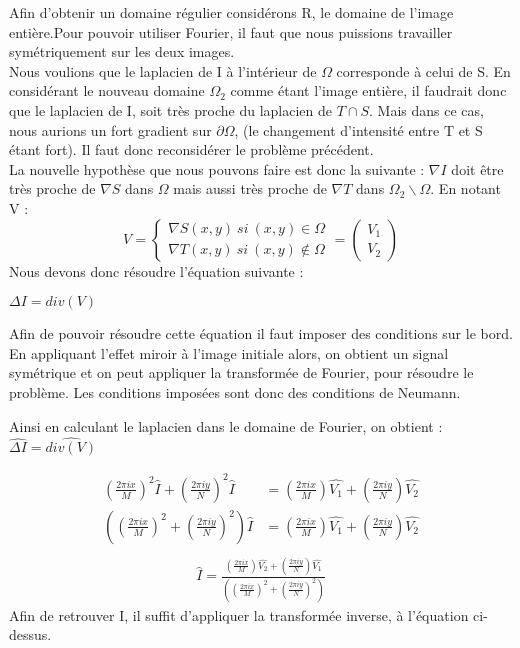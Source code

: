 Afin d'obtenir un domaine régulier considérons R, le domaine de l'image entière.Pour pouvoir utiliser Fourier, il faut que nous puissions travailler symétriquement sur les deux images.\\
Nous voulions que le laplacien de I à l'intérieur de $\Omega$ corresponde à celui de S. En considérant le nouveau domaine $\Omega_2$ comme étant l'image entière, il faudrait donc que le laplacien de I, soit très proche du laplacien de $T \cap S$. Mais dans ce cas, nous aurions un fort gradient sur $\partial \Omega$, (le  changement d'intensité entre T et S étant fort).  Il faut donc reconsidérer le problème précédent. \\
La nouvelle hypothèse que nous pouvons faire  est donc la suivante : $\nabla I$ doit être très proche de $\nabla S$ dans $\Omega$ mais aussi très proche de $\nabla T$ dans $\Omega_2 \backslash \Omega$. En notant V : 
\begin{equation}
V = 
\left\{
\begin{aligned}
\nabla S(x,y) \ si \ (x,y) \in \Omega\\
\nabla T(x,y) \ si \ (x,y) \notin \Omega
\end{aligned}
\right.
= \begin{pmatrix}
V_1\\
V_2
\end{pmatrix}
\end{equation}
Nous devons donc résoudre l'équation suivante : 
\begin{center}
$ \Delta I = div(V)$
\end{center}
Afin de pouvoir résoudre cette équation il faut imposer des conditions sur le bord. En appliquant l'effet miroir à l'image initiale alors, on obtient un signal symétrique  et on peut appliquer la transformée de Fourier, pour résoudre le problème.  Les conditions imposées sont donc des conditions de Neumann.

Ainsi en calculant le laplacien dans le domaine de Fourier, on obtient  : $\widehat{\Delta I} = \widehat{div(V)}$

\begin{equation}
\begin{aligned}
\left(\frac{2\pi i x}{M}\right)^2 \widehat{I}+\left(\frac{2\pi i y}{N}\right)^2 \widehat{I} & = \left(\frac{2\pi i x}{M}\right) \widehat{V_1}+\left(\frac{2\pi i y}{N}\right) \widehat{V_2}\\
\left(\left(\frac{2\pi i x}{M}\right)^2+\left(\frac{2\pi i y}{N}\right)^2\right) \widehat{I} & = \left(\frac{2\pi i x}{M}\right) \widehat{ V_1}+\left(\frac{2\pi i y}{N}\right) \widehat{V_2}\\
\end{aligned}
\end{equation}
\begin{equation}
\begin{aligned}
\widehat{I} = \frac{\left(\frac{2\pi i x}{M}\right) \widehat{ V_2}+\left(\frac{2\pi i y}{N}\right) \widehat{V_1}}{\left(\left(\frac{2\pi i x}{M}\right)^2+\left(\frac{2\pi i y}{N}\right)^2\right)}
\end{aligned}
\end{equation}
Afin de retrouver I, il suffit d'appliquer la transformée inverse, à l'équation ci-dessus.
